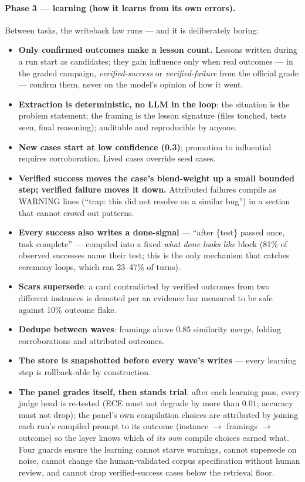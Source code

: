 \documentclass[11pt]{article}
\begin{document}
\paragraph{Phase 3 --- learning (how it learns from its own errors).} Between tasks, the writeback law runs --- and it is deliberately boring:
\begin{itemize}
  \item \textbf{Only confirmed outcomes make a lesson count.} Lessons written during a run start as candidates; they gain influence only when real outcomes --- in the graded campaign, \emph{verified-success} or \emph{verified-failure} from the official grade --- confirm them, never on the model's opinion of how it went.
  \item \textbf{Extraction is deterministic, no LLM in the loop}: the situation is the problem statement; the framing is the lesson signature (files touched, tests seen, final reasoning); auditable and reproducible by anyone.
  \item \textbf{New cases start at low confidence (0.3)}; promotion to influential requires corroboration. Lived cases override seed cases.
  \item \textbf{Verified success moves the case's blend-weight up a small bounded step; verified failure moves it down.} Attributed failures compile as WARNING lines (``trap: this did not resolve on a similar bug'') in a section that cannot crowd out patterns.
  \item \textbf{Every success also writes a done-signal} --- ``after \{test\} passed once, task complete'' --- compiled into a fixed \emph{what done looks like} block (81\% of observed successes name their test; this is the only mechanism that catches ceremony loops, which ran 23--47\% of turns).
  \item \textbf{Scars supersede}: a card contradicted by verified outcomes from two different instances is demoted per an evidence bar measured to be safe against 10\% outcome flake.
  \item \textbf{Dedupe between waves}: framings above 0.85 similarity merge, folding corroborations and attributed outcomes.
  \item \textbf{The store is snapshotted before every wave's writes} --- every learning step is rollback-able by construction.
  \item \textbf{The panel grades itself, then stands trial}: after each learning pass, every judge head is re-tested (ECE must not degrade by more than $0.01$; accuracy must not drop); the panel's own compilation choices are attributed by joining each run's compiled prompt to its outcome (instance $\to$ framings $\to$ outcome) so the layer knows which of \emph{its own} compile choices earned what. Four guards ensure the learning cannot starve warnings, cannot supersede on noise, cannot change the human-validated corpus specification without human review, and cannot drop verified-success cases below the retrieval floor.
\end{itemize}
\end{document}
